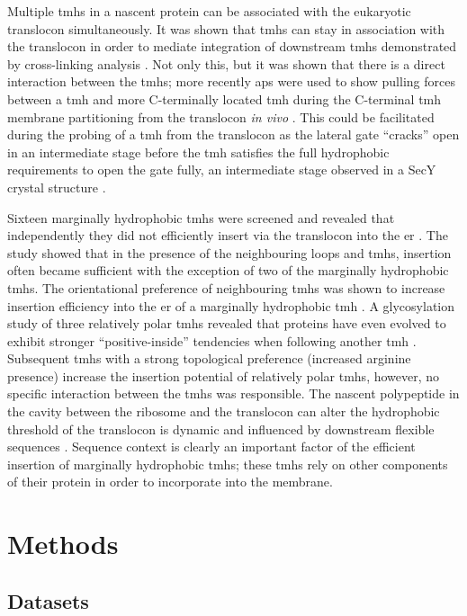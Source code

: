 Multiple \gls{tmh}s in a nascent protein can be associated with the eukaryotic translocon simultaneously.
It was shown that \gls{tmh}s can stay in association with the translocon in order to mediate integration of downstream \gls{tmh}s demonstrated by  cross\--linking analysis \cite{Sadlish2005, Cross2009}.
Not only this, but it was shown that there is a direct interaction between the \gls{tmh}s; more recently \gls{ap}s were used to show pulling forces between a \gls{tmh} and more C-terminally located \gls{tmh} during the C-terminal \gls{tmh} membrane partitioning from the translocon \textit{in vivo} \cite{Cymer2013}.
This could be facilitated during the probing of a \gls{tmh} from the translocon as the lateral gate ``cracks'' open in an intermediate stage before the \gls{tmh} satisfies the full hydrophobic requirements to open the gate fully, an intermediate stage observed in a SecY crystal structure \cite{Egea2010}.

Sixteen marginally hydrophobic \gls{tmh}s were screened and revealed that independently they did not efficiently insert via the translocon into the \gls{er} \cite{Hedin2010}.
The study showed that in the presence of the neighbouring loops and \gls{tmh}s, insertion often became sufficient with the exception of two of the marginally hydrophobic \gls{tmh}s.
The orientational preference of neighbouring \gls{tmh}s was shown to increase insertion efficiency into the \gls{er} of a marginally hydrophobic \gls{tmh} \cite{Ojemalm2012}.
A glycosylation study of three relatively polar \gls{tmh}s revealed that proteins have even evolved to exhibit stronger ``positive\--inside'' tendencies when following another \gls{tmh} \cite{Virkki2014}.
Subsequent \gls{tmh}s with a strong topological preference (increased arginine presence) increase the insertion potential of relatively polar \gls{tmh}s, however, no specific interaction between the \gls{tmh}s was responsible.
The nascent polypeptide in the cavity between the ribosome and the translocon can
alter the hydrophobic threshold of the translocon is dynamic and influenced by downstream flexible sequences \cite{Junne2017}.
Sequence context is clearly an important factor of the efficient insertion of marginally hydrophobic \gls{tmh}s; these \gls{tmh}s rely on other components of their protein in order to incorporate into the membrane.

\section{Methods}
\subsection{Datasets}
